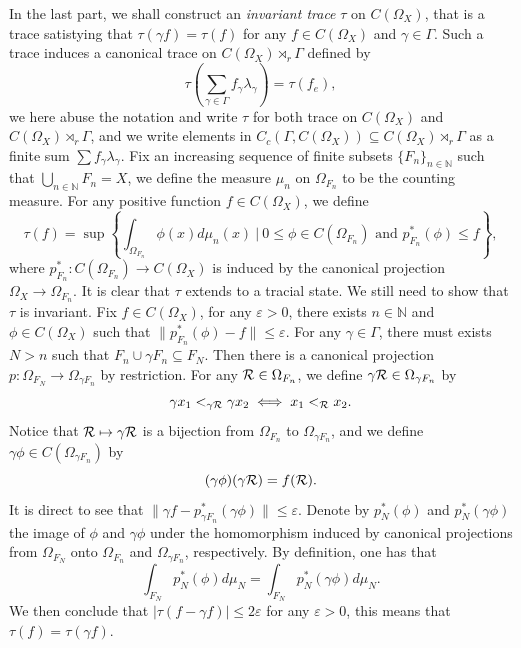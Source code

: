 \documentclass[11pt]{article}
\theoremstyle{definition}
\theoremstyle{plain}
\def\IN{\mathbb N}\def\IR{\mathbb R}\def\IE{\mathbb E}\def\IC{\mathbb C}\def\IL{\mathbb L}\def\IQ{\mathbb Q}\def\IA{\mathbb A}\def\IZ{\mathbb Z}
\def\Ga{\Gamma}
\begin{document}
In the last part, we shall construct an \emph{invariant trace} $\tau$ on $C(\Omega_X)$, that is a trace satistying that $\tau(\gamma f)=\tau(f)$ for any $f\in C(\Omega_X)$ and $\gamma\in\Ga$. Such a trace induces a canonical trace on $C(\Omega_X)\rtimes_r\Ga$ defined by
$$\tau\left(\sum_{\gamma\in\Ga}f_\gamma\lambda_\gamma\right)=\tau(f_e),$$
we here abuse the notation and write $\tau$ for both trace on $C(\Omega_X)$ and $C(\Omega_X)\rtimes_r\Ga$, and we write elements in $C_c(\Gamma,C(\Omega_X))\subseteq C(\Omega_X)\rtimes_r\Ga$ as a finite sum $\sum f_\gamma\lambda_\gamma$. Fix an increasing sequence of finite subsets $\{F_n\}_{n\in\IN}$ such that $\bigcup_{n\in\IN} F_n=X$, we define the measure $\mu_n$ on $\Omega_{F_n}$ to be the counting measure. For any positive function $f\in C(\Omega_X)$, we define
$$\tau(f)=\sup\left\{\int_{\Omega_{F_n}}\phi(x)d\mu_n(x)\ \Big|\ 0\leq\phi\in C(\Omega_{F_n})\text{ and }p^*_{F_n}(\phi)\leq f  \right\},$$
where $p^*_{F_n}:C(\Omega_{F_n})\to C(\Omega_X)$ is induced by the canonical projection $\Omega_X\to\Omega_{F_n}$. It is clear that $\tau$ extends to a tracial state. We still need to show that $\tau$ is invariant. Fix $f\in C(\Omega_X)$, for any $\varepsilon>0$, there exists $n\in\IN$ and $\phi\in C(\Omega_X)$ such that $\|p^*_{F_n}(\phi)-f\|\leq\varepsilon$. For any $\gamma\in\Ga$, there must exists $N>n$ such that $F_n\cup\gamma F_n\subseteq F_N$. Then there is a canonical projection $p:\Omega_{F_N}\to\Omega_{\gamma F_n}$ by restriction. For any $\mathcal R\in\Omega_{F_n}$, we define $\gamma \mathcal R\in\Omega_{\gamma F_n}$ by
$$\gamma x_1<_{\gamma \mathcal R}\gamma x_2\iff x_1<_{\mathcal R}x_2.$$
Notice that $\mathcal R\mapsto\gamma\mathcal R$ is a bijection from $\Omega_{F_n}$ to $\Omega_{\gamma F_n}$, and we define $\gamma\phi\in C(\Omega_{\gamma F_n})$ by
$$(\gamma\phi)(\gamma\mathcal R)=f(\mathcal R).$$
It is direct to see that $\|\gamma f-p^*_{\gamma F_n}(\gamma\phi)\|\leq\varepsilon$.
Denote by $p^*_N(\phi)$ and $p^*_N(\gamma\phi)$ the image of $\phi$ and $\gamma\phi$ under the homomorphism induced by canonical projections from $\Omega_{F_N}$ onto $\Omega_{F_n}$ and $\Omega_{\gamma F_n}$, respectively. By definition, one has that
$$\int_{F_N}p^*_N(\phi)d\mu_N=\int_{F_N}p^*_N(\gamma\phi)d\mu_N.$$
We then conclude that $|\tau(f-\gamma f)|\leq 2\varepsilon$ for any $\varepsilon>0$, this means that $\tau(f)=\tau(\gamma f)$.
\end{document}
